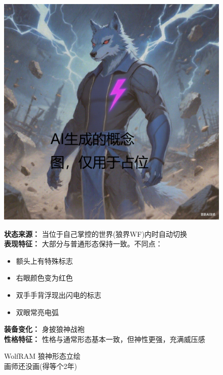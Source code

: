 \documentclass[lang=cn,newtx,10pt,scheme=chinese]{elegantbook}
\newcommand{\wf}{WolfRAM}
\begin{document}
\noindent
\begin{figure}[H]
    \begin{minipage}[c]{0.48\textwidth}
        \centering
        \includegraphics[width=\linewidth]{wolfram/god.png} %
        \centering
        \caption{\wf{} 狼神形态立绘\\ \centering 画师还没画(得等个2年)}
        \label{fig:wfgod}
    \end{minipage}
    \hfill
    \begin{minipage}[c]{0.48\textwidth}
        \textbf{状态来源：} 当位于自己掌控的世界(狼界WF)内时自动切换 \\
        \textbf{表现特征：}
        大部分与普通形态保持一致。不同点：
        \begin{itemize}
            \setlength\itemsep{0em}
            \item 额头上有特殊标志
            \item 右眼颜色变为红色
            \item 双手手背浮现出闪电的标志
            \item 双眼常亮电弧
        \end{itemize}
        \textbf{装备变化：} 身披狼神战袍 \\
        \textbf{性格特征：} 性格与通常形态基本一致，但神性更强，充满威压感\\
        \vspace*{\fill}
    \end{minipage}
\end{figure}
\end{document}
